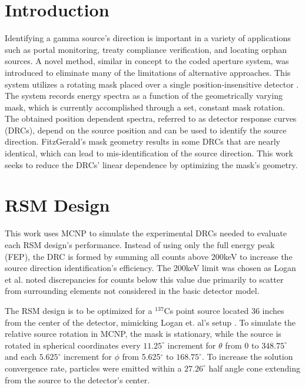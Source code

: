 \documentclass[twocolumn,10pt,final]{asme2ej}
\begin{document}
\section{Introduction}
\label{intro}
Identifying a gamma source's direction is important in a variety of applications such as portal monitoring, treaty compliance verification, and locating orphan sources.  
A novel method, similar in concept to the coded aperture system, was introduced to eliminate many of the limitations of alternative approaches.
This system utilizes a rotating mask placed over a single position-insensitive detector \cite{FitzGerald2015}.  
The system records energy spectra as a function of the geometrically varying mask, which is currently accomplished through a set, constant mask rotation. 
The obtained position dependent spectra, referred to as detector response curves (DRCs), depend on the source position and can be used to identify the source direction.  FitzGerald's mask geometry results in some DRCs that are nearly identical, which can lead to mis-identification of the source direction.  
This work seeks to reduce the DRCs' linear dependence by optimizing the mask's geometry.

\vspace{-0.3 cm}
\section{RSM Design} \label{sec:rsm-design}
This work uses MCNP to simulate the experimental DRCs needed to evaluate each RSM design's performance.  
Instead of using only the full energy peak (FEP), the DRC is formed by summing all counts above 200keV to increase the source direction identification's efficiency.  
The 200keV limit was chosen as Logan et al. \cite{Logan2017} noted discrepancies for counts below this value due primarily to scatter from surrounding elements not considered in the basic detector model.

The RSM design is to be optimized for a $^{137}$Cs point source located 36 inches from the center of the detector, mimicking Logan et. al's setup \cite{Logan2017}.  
To simulate the relative source rotation in MCNP, the mask is stationary, while the source is rotated in spherical coordinates every $11.25^\circ$ increment for $\theta$ from 0 to $348.75^\circ$ and each $5.625^\circ$ increment for $\phi$ from 5.625$^\circ$ to $168.75^\circ$.  
To increase the solution convergence rate, particles were emitted within a $27.26^\circ$ half angle cone extending from the source to the detector's center.  
\end{document}
